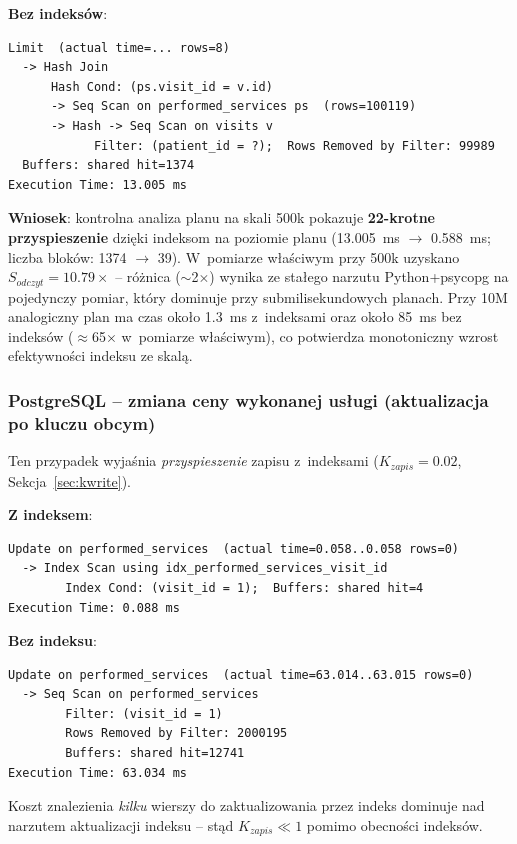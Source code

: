 \documentclass[12pt,a4paper]{article}
\begin{document}
\textbf{Bez indeksów}:
\begin{lstlisting}[basicstyle=\ttfamily\scriptsize]
Limit  (actual time=... rows=8)
  -> Hash Join
      Hash Cond: (ps.visit_id = v.id)
      -> Seq Scan on performed_services ps  (rows=100119)
      -> Hash -> Seq Scan on visits v
            Filter: (patient_id = ?);  Rows Removed by Filter: 99989
  Buffers: shared hit=1374
Execution Time: 13.005 ms
\end{lstlisting}

\textbf{Wniosek}: kontrolna analiza planu na skali 500k pokazuje \textbf{22-krotne przyspieszenie} dzięki indeksom na poziomie planu (13.005~ms $\to$ 0.588~ms; liczba bloków: 1374 $\to$ 39). W~pomiarze właściwym przy 500k uzyskano $S_{odczyt}=10.79\times$ -- różnica ($\sim$2$\times$) wynika ze stałego narzutu Python+psycopg na pojedynczy pomiar, który dominuje przy submilisekundowych planach. Przy 10M analogiczny plan ma czas około 1.3~ms z~indeksami oraz około 85~ms bez indeksów ($\approx$65$\times$ w~pomiarze właściwym), co potwierdza monotoniczny wzrost efektywności indeksu ze skalą.

\subsubsection{PostgreSQL -- zmiana ceny wykonanej usługi (aktualizacja po kluczu obcym)}

Ten przypadek wyjaśnia \emph{przyspieszenie} zapisu z~indeksami ($K_{zapis}=0.02$, Sekcja~\ref{sec:kwrite}).

\textbf{Z indeksem}:
\begin{lstlisting}[basicstyle=\ttfamily\scriptsize]
Update on performed_services  (actual time=0.058..0.058 rows=0)
  -> Index Scan using idx_performed_services_visit_id
        Index Cond: (visit_id = 1);  Buffers: shared hit=4
Execution Time: 0.088 ms
\end{lstlisting}

\textbf{Bez indeksu}:
\begin{lstlisting}[basicstyle=\ttfamily\scriptsize]
Update on performed_services  (actual time=63.014..63.015 rows=0)
  -> Seq Scan on performed_services
        Filter: (visit_id = 1)
        Rows Removed by Filter: 2000195
        Buffers: shared hit=12741
Execution Time: 63.034 ms
\end{lstlisting}

Koszt znalezienia \emph{kilku} wierszy do zaktualizowania przez indeks dominuje nad narzutem aktualizacji indeksu -- stąd $K_{zapis} \ll 1$ pomimo obecności indeksów.
\end{document}
